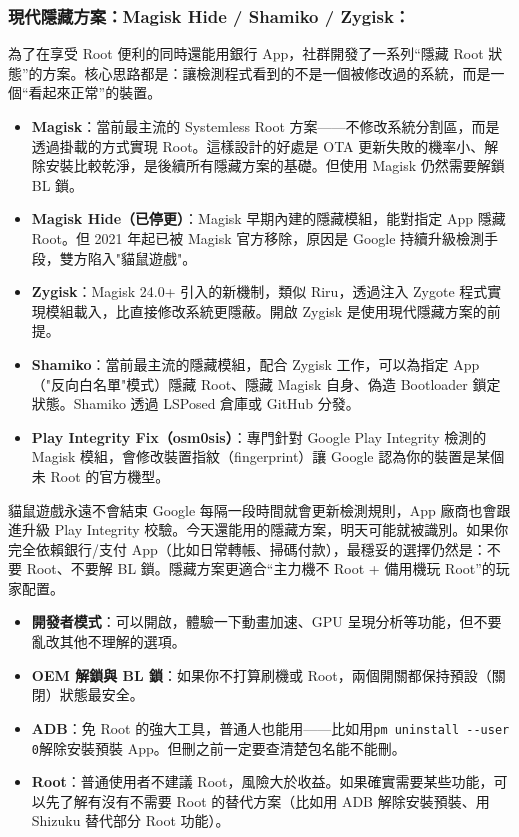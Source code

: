 \subsubsection*{現代隱藏方案：Magisk Hide / Shamiko / Zygisk：}

為了在享受 Root 便利的同時還能用銀行 App，社群開發了一系列“隱藏 Root 狀態”的方案。核心思路都是：讓檢測程式看到的不是一個被修改過的系統，而是一個“看起來正常”的裝置。

\begin{itemize}
  \item \textbf{Magisk}：當前最主流的 Systemless Root 方案——不修改系統分割區，而是透過掛載的方式實現 Root。這樣設計的好處是 OTA 更新失敗的機率小、解除安裝比較乾淨，是後續所有隱藏方案的基礎。但使用 Magisk 仍然需要解鎖 BL 鎖。
  \item \textbf{Magisk Hide（已停更）}：Magisk 早期內建的隱藏模組，能對指定 App 隱藏 Root。但 2021 年起已被 Magisk 官方移除，原因是 Google 持續升級檢測手段，雙方陷入"貓鼠遊戲"。
  \item \textbf{Zygisk}：Magisk 24.0+ 引入的新機制，類似 Riru，透過注入 Zygote 程式實現模組載入，比直接修改系統更隱蔽。開啟 Zygisk 是使用現代隱藏方案的前提。
  \item \textbf{Shamiko}：當前最主流的隱藏模組，配合 Zygisk 工作，可以為指定 App（"反向白名單"模式）隱藏 Root、隱藏 Magisk 自身、偽造 Bootloader 鎖定狀態。Shamiko 透過 LSPosed 倉庫或 GitHub 分發。
  \item \textbf{Play Integrity Fix（osm0sis）}：專門針對 Google Play Integrity 檢測的 Magisk 模組，會修改裝置指紋（fingerprint）讓 Google 認為你的裝置是某個未 Root 的官方機型。
\end{itemize}

\begin{tcbwarn}{貓鼠遊戲永遠不會結束}
Google 每隔一段時間就會更新檢測規則，App 廠商也會跟進升級 Play Integrity 校驗。今天還能用的隱藏方案，明天可能就被識別。如果你完全依賴銀行/支付 App（比如日常轉帳、掃碼付款），最穩妥的選擇仍然是：不要 Root、不要解 BL 鎖。隱藏方案更適合“主力機不 Root + 備用機玩 Root”的玩家配置。

\end{tcbwarn}


\begin{itemize}
  \item \textbf{開發者模式}：可以開啟，體驗一下動畫加速、GPU 呈現分析等功能，但不要亂改其他不理解的選項。
  \item \textbf{OEM 解鎖與 BL 鎖}：如果你不打算刷機或 Root，兩個開關都保持預設（關閉）狀態最安全。
  \item \textbf{ADB}：免 Root 的強大工具，普通人也能用——比如用\texttt{pm uninstall -\allowbreak -\allowbreak user 0}解除安裝預裝 App。但刪之前一定要查清楚包名能不能刪。
  \item \textbf{Root}：普通使用者不建議 Root，風險大於收益。如果確實需要某些功能，可以先了解有沒有不需要 Root 的替代方案（比如用 ADB 解除安裝預裝、用 Shizuku 替代部分 Root 功能）。
\end{itemize}

